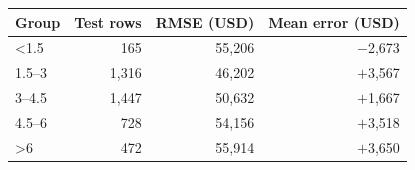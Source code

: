\begin{tabular}{lrrr}
\toprule
Group & Test rows & RMSE (USD) & Mean error (USD) \\
\midrule
<1.5 & 165 & 55,206 & $-$2,673 \\
1.5--3 & 1,316 & 46,202 & $+$3,567 \\
3--4.5 & 1,447 & 50,632 & $+$1,667 \\
4.5--6 & 728 & 54,156 & $+$3,518 \\
>6 & 472 & 55,914 & $+$3,650 \\
\bottomrule
\end{tabular}
